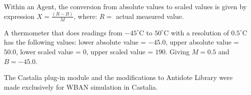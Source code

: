 Within an Agent, the conversion from absolute values to scaled values is given by expression $X = \frac{(R - B)}{M}$, where: $R =$ actual measured value.


A thermometer that does readings from $-45^\circ$C  to $50^\circ$C with a resolution of $0.5^\circ$C has the following values: lower absolute value = $-45.0$, upper absolute value = $50.0$, lower scaled value = $0$, upper scaled value = $190$. Giving $M = 0.5$ and $B = -45.0$.



The Castalia plug-in module and the modifications to Antidote Library were made exclusively for WBAN simulation in Castalia.

